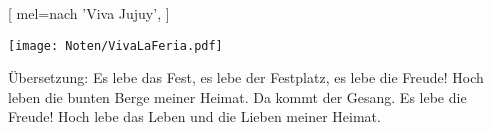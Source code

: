 [
    mel={nach 'Viva Jujuy'},
]

\beginverse
\endverse
\texttt{[image: Noten/VivaLaFeria.pdf]}

\endsong

\beginscripture{}
Übersetzung:
Es lebe das Fest, es lebe der Festplatz, es lebe die Freude!
Hoch leben die bunten Berge meiner Heimat.
Da kommt der Gesang. Es lebe die Freude!
Hoch lebe das Leben und die Lieben meiner Heimat.
\endscripture